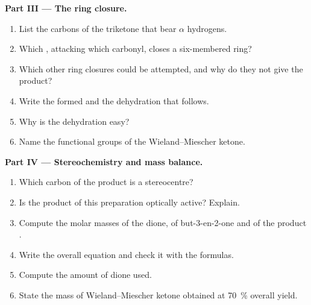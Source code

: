 \begin{problem}
\medskip
\noindent\textbf{Part III --- The ring closure.}
\begin{enumerate}[resume]
  \item List the carbons of the triketone that bear $\alpha$ hydrogens.
  \item Which , attacking which carbonyl, closes a six-membered ring?
  \item Which other ring closures could be attempted, and why do they not give the product?
  \item Write the  formed and the dehydration that follows.
  \item Why is the dehydration easy?
  \item Name the functional groups of the Wieland--Miescher ketone.
\end{enumerate}

\medskip
\noindent\textbf{Part IV --- Stereochemistry and mass balance.}
\begin{enumerate}[resume]
  \item Which carbon of the product is a stereocentre?
  \item Is the product of this preparation optically active? Explain.
  \item Compute the molar masses of the dione, of but-3-en-2-one and of the product
        .
  \item Write the overall equation and check it with the formulas.
  \item Compute the amount of dione used.
  \item State the mass of Wieland--Miescher ketone obtained at 70~\% overall yield.
\end{enumerate}
\end{problem}
